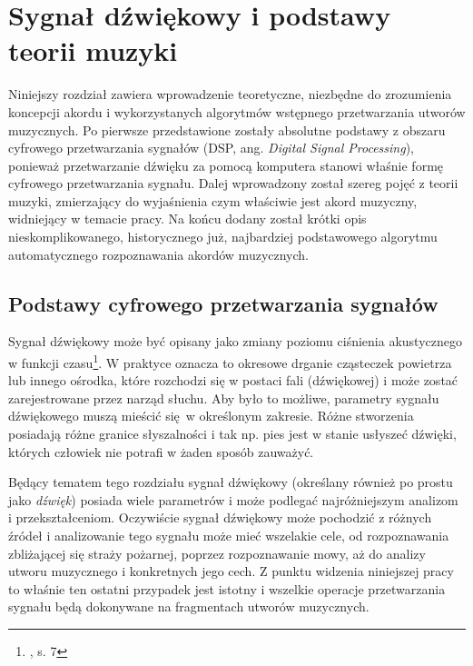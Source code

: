\chapter{Sygnał dźwiękowy i podstawy teorii muzyki} \label{chapter:music_theory}

Niniejszy rozdział zawiera wprowadzenie teoretyczne, niezbędne do zrozumienia koncepcji akordu i wykorzystanych algorytmów wstępnego przetwarzania utworów muzycznych. Po pierwsze przedstawione zostały absolutne podstawy z obszaru cyfrowego przetwarzania sygnałów (DSP, ang. \emph{Digital Signal Processing}), ponieważ przetwarzanie dźwięku za pomocą komputera stanowi właśnie formę cyfrowego przetwarzania sygnału. Dalej wprowadzony został szereg pojęć z teorii muzyki, zmierzający do wyjaśnienia czym właściwie jest akord muzyczny, widniejący w temacie pracy. Na końcu dodany został krótki opis nieskomplikowanego, historycznego już, najbardziej podstawowego algorytmu automatycznego rozpoznawania akordów muzycznych.



\section{Podstawy cyfrowego przetwarzania sygnałów}

Sygnał dźwiękowy może być opisany jako zmiany poziomu ciśnienia akustycznego w funkcji czasu\footnote{\cite{lerch_introduction_2012}, s. 7}. W praktyce oznacza to okresowe drganie cząsteczek powietrza lub innego ośrodka, które rozchodzi się w postaci fali (dźwiękowej) i może zostać zarejestrowane przez narząd słuchu. Aby było to możliwe, parametry sygnału dźwiękowego muszą mieścić się w określonym zakresie. Różne stworzenia posiadają różne granice słyszalności i tak np. pies jest w stanie usłyszeć dźwięki, których człowiek nie potrafi w żaden sposób zauważyć. 

Będący tematem tego rozdziału sygnał dźwiękowy (określany również po prostu jako \emph{dźwięk}) posiada wiele parametrów i może podlegać najróżniejszym analizom i przekształceniom.  Oczywiście sygnał dźwiękowy może pochodzić z różnych źródeł i analizowanie tego sygnału może mieć wszelakie cele, od rozpoznawania zbliżającej się straży pożarnej, poprzez rozpoznawanie mowy, aż do analizy utworu muzycznego i konkretnych jego cech. Z punktu widzenia niniejszej pracy to właśnie ten ostatni przypadek jest istotny i wszelkie operacje przetwarzania sygnału będą dokonywane na fragmentach utworów muzycznych.

